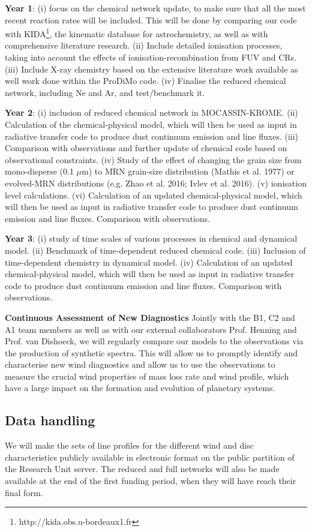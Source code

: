 \documentclass[10pt,fleqn,twoside]{article}
\newcommand{\Tcol}{\color{blue}}
\begin{document}
{\bf Year 1}: (i) focus on the chemical network update, to make sure that all the most recent reaction rates will be included. This will be done by comparing our code with KIDA\footnote{http://kida.obs.u-bordeaux1.fr}, the kinematic database for astrochemistry, as well as with comprehensive literature research.  (ii) Include detailed ionisation processes, taking into account the effects of ionisation-recombination from FUV and CRs. (iii) Include X-ray chemistry based on the extensive literature work available as well work done within the ProDiMo code. (iv) Finalise the reduced chemical network, including Ne and Ar, and test/benchmark it. 

{\bf Year 2}: (i) inclusion of reduced chemical network in MOCASSIN-KROME. (ii) Calculation of the chemical-physical model, which will then be used as input in radiative transfer code to produce dust continuum emission and line fluxes. (iii) Comparison with observations and further update of chemical code based on observational constraints. (iv) Study of the effect of changing the grain size from mono-disperse (0.1 $\mu$m) to MRN grain-size distribution (Mathis et al. 1977) or evolved-MRN distributions (e.g. Zhao et al. 2016; Ivlev et al. 2016). (v) ionisation level calculations. (vi)  Calculation of an updated chemical-physical model, which will then be used as input in radiative transfer code to produce dust continuum emission and line fluxes. Comparison with observations.

{\bf Year 3}: (i) study of time scales of various processes in chemical and dynamical model. (ii) Benchmark of time-dependent reduced chemical code. (iii) Inclusion of time-dependent chemistry in dynamical model. (iv)  Calculation of an updated chemical-physical model, which will then be used as input in radiative transfer code to produce dust continuum emission and line fluxes. Comparison with observations.

{\bf Continuous Assessment of New Diagnostics} Jointly with the B1, C2 and A1 team members as well as with our external collaborators Prof. Henning and Prof. van Dishoeck, we will regularly compare our models to the observations via the production of synthetic spectra. This will allow us to promptly identify and characterise new wind diagnostics and allow us to use the observations to measure the crucial wind properties of mass loss rate and wind profile, which have a large impact on the formation and evolution of planetary systems. 

\subsection{\Tcol Data handling}
We will make the sets of line profiles for the different wind and disc characteristics publicly available in electronic format on the public partition of the Research Unit server. The reduced and full networks will also be made available at the end of the first funding period, when they will have reach their final form. 
\end{document}
